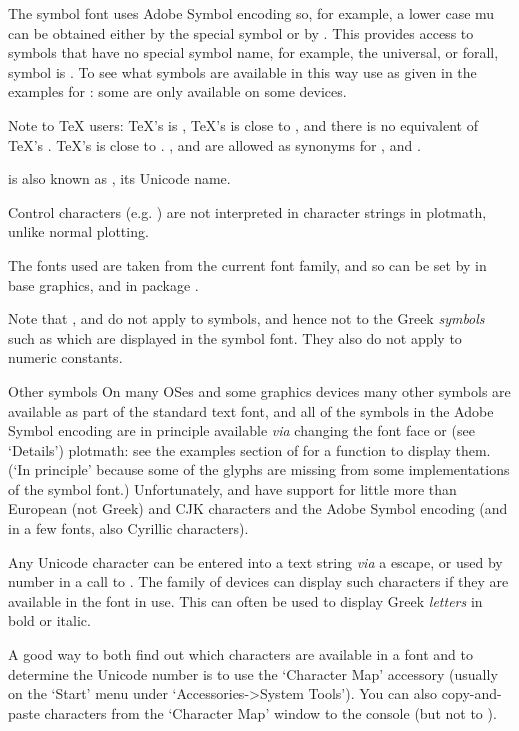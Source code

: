 \begin{Details}
The symbol font uses Adobe Symbol encoding so, for example, a lower
case mu can be obtained either by the special symbol  or by
.  This provides access to symbols that have no
special symbol name, for example, the universal, or forall, symbol is
.  To see what symbols are available in this way
use  as given in the examples for
: some are only available on some devices.

Note to TeX users: TeX's  is , TeX's
 is close to , and there is no
equivalent of TeX's .  TeX's  is close to
.  ,  and  are
allowed as synonyms for ,  and .

 is also known as , its Unicode name.

Control characters (e.g. ) are not interpreted in character
strings in plotmath, unlike normal plotting.

The fonts used are taken from the current font family, and so can be
set by  in base graphics, and
 in package .

Note that ,  and  do not
apply to symbols, and hence not to the Greek \emph{symbols} such as
 which are displayed in the symbol font.  They also do not
apply to numeric constants.
\end{Details}
%
\begin{Section}{Other symbols}
On many OSes and some graphics devices many other symbols are
available as part of the standard text font, and all of the symbols in
the Adobe Symbol encoding are in principle available \emph{via}
changing the font face or (see `Details') plotmath: see the
examples section of  for a function to display
them.  (`In principle' because some of the glyphs are missing
from some implementations of the symbol font.)  Unfortunately,
 and  have support for little
more than European (not Greek) and CJK characters and the Adobe Symbol
encoding (and in a few fonts, also Cyrillic characters).

Any Unicode character can be entered into a text string \emph{via} a
 escape, or used by number in a call to
.  The  family of devices can
display such characters if they are available in the font in use.
This can often be used to display Greek \emph{letters} in bold or italic.

A good way to both find out which characters are available in a font
and to determine the Unicode number is to use the `Character
Map' accessory (usually on the `Start' menu under
`Accessories->System Tools').  You can also copy-and-paste
characters from the `Character Map' window to the 
console (but not to ).
\end{Section}
